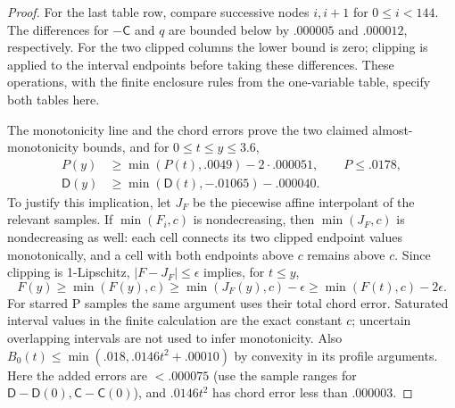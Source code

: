 \begin{proof}
For the last table row, compare successive nodes $i,i+1$ for $0\le i<144$. The differences for $-\mathsf C$ and $q$ are bounded below by $.000005$ and $.000012$, respectively. For the two clipped columns the lower bound is zero; clipping is applied to the interval endpoints before taking these differences. These operations, with the finite enclosure rules from the one-variable table, specify both tables here.

The monotonicity line and the chord errors prove the two claimed almost-monotonicity bounds, and for $0\le t\le y\le3.6$,
\[
 \begin{aligned}
 P(y)&\ge\min(P(t),.0049)-2\cdot.000051,\qquad P\le.0178,\\
 \mathsf D(y)&\ge\min(\mathsf D(t),-.01065)-.000040 .
 \end{aligned}
\]
To justify this implication, let $J_F$ be the piecewise affine interpolant of the relevant samples. If $\min(F_i,c)$ is nondecreasing, then $\min(J_F,c)$ is nondecreasing as well: each cell connects its two clipped endpoint values monotonically, and a cell with both endpoints above $c$ remains above $c$. Since clipping is 1-Lipschitz, $|F-J_F|\le\epsilon$ implies, for $t\le y$,
\[
 F(y)\ge\min(F(y),c)
 \ge\min(J_F(y),c)-\epsilon
 \ge\min(F(t),c)-2\epsilon.
\]
For starred P samples the same argument uses their total chord error. Saturated interval values in the finite calculation are the exact constant $c$; uncertain overlapping intervals are not used to infer monotonicity. Also $B_0(t)\le\min(.018,.0146t^2+.00010)$ by convexity in its profile arguments. Here the added errors are $<.000075$ (use the sample ranges for $\mathsf D-\mathsf D(0),\mathsf C-\mathsf C(0)$), and $.0146t^2$ has chord error less than .000003.


\end{proof}
